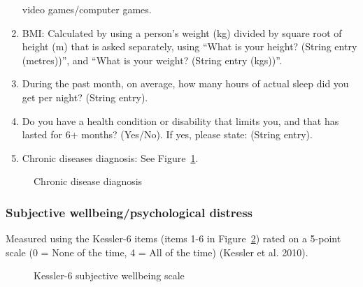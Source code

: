 \documentclass[
]{interact}
\begin{document}
\begin{enumerate}
  video games/computer games.
\item
  BMI: Calculated by using a person's weight (kg) divided by square root
  of height (m) that is asked separately, using ``What is your height?
  (String entry (metres))'', and ``What is your weight? (String entry
  (kgs))''.
\item
  During the past month, on average, how many hours of actual sleep did
  you get per night? (String entry).
\item
  Do you have a health condition or disability that limits you, and that
  has lasted for 6+ months? (Yes/No). If yes, please state: (String
  entry).
\item
  Chronic diseases diagnosis: See Figure~\ref{fig-chrondis}.
\end{enumerate}

\begin{figure}


\caption{\label{fig-chrondis}Chronic disease diagnosis}

\end{figure}%

\subsubsection{Subjective wellbeing/psychological
distress}\label{subjective-wellbeingpsychological-distress}

Measured using the Kessler-6 items (items 1-6 in
Figure~\ref{fig-Kess-6}) rated on a 5-point scale (0 = None of the time,
4 = All of the time) (Kessler et al. 2010).

\begin{figure}


\caption{\label{fig-Kess-6}Kessler-6 subjective wellbeing scale}

\end{figure}%
\end{document}

